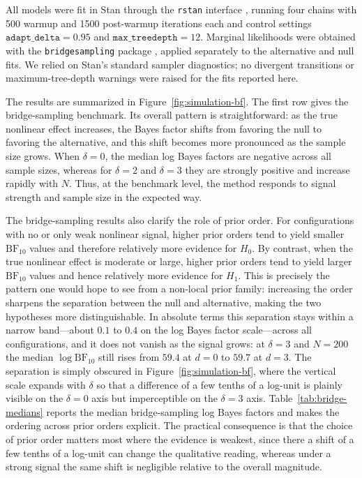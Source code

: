 \documentclass{article}
\begin{document}
All models were fit in Stan through the \texttt{rstan} interface
\parencite{Stan}, running four chains with 500 warmup and 1500
post-warmup iterations each and control settings
$\texttt{adapt\_delta}=0.95$ and $\texttt{max\_treedepth}=12$. Marginal
likelihoods were obtained with the \texttt{bridgesampling} package
\parencite{Gronau2017}, applied separately to the alternative and null
fits. We relied on Stan's standard sampler diagnostics; no divergent
transitions or maximum-tree-depth warnings were raised for the fits
reported here.

The results are summarized in Figure~\ref{fig:simulation-bf}. The first
row gives the bridge-sampling benchmark. Its overall pattern is
straightforward: as the true nonlinear effect increases, the Bayes
factor shifts from favoring the null to favoring the alternative, and
this shift becomes more pronounced as the sample size grows. When
$\delta=0$, the median log Bayes factors are negative across all sample
sizes, whereas for $\delta=2$ and $\delta=3$ they are strongly positive
and increase rapidly with $N$. Thus, at the benchmark level, the method
responds to signal strength and sample size in the expected way.

The bridge-sampling results also clarify the role of prior order. For
configurations with no or only weak nonlinear signal, higher prior
orders tend to yield smaller $\mathrm{BF}_{10}$ values and therefore
relatively more evidence for $H_0$. By contrast, when the true
nonlinear effect is moderate or large, higher prior orders tend to yield
larger $\mathrm{BF}_{10}$ values and hence relatively more evidence for
$H_1$. This is precisely the pattern one would hope to see from a
non-local prior family: increasing the order sharpens the separation
between the null and alternative, making the two hypotheses more
distinguishable. In absolute terms this separation stays within a narrow band---about
$0.1$ to $0.4$ on the log Bayes factor scale---across all configurations,
and it does not vanish as the signal grows: at $\delta=3$ and $N=200$ the
median $\log\mathrm{BF}_{10}$ still rises from $59.4$ at $d=0$ to $59.7$
at $d=3$. The separation is simply obscured in
Figure~\ref{fig:simulation-bf}, where the vertical scale expands with
$\delta$ so that a difference of a few tenths of a log-unit is plainly
visible on the $\delta=0$ axis but imperceptible on the $\delta=3$ axis.
Table~\ref{tab:bridge-medians} reports the median bridge-sampling log
Bayes factors and makes the ordering across prior orders explicit. The
practical consequence is that the choice of prior order matters most
where the evidence is weakest, since there a shift of a few tenths of a
log-unit can change the qualitative reading, whereas under a strong
signal the same shift is negligible relative to the overall magnitude.
\end{document}
